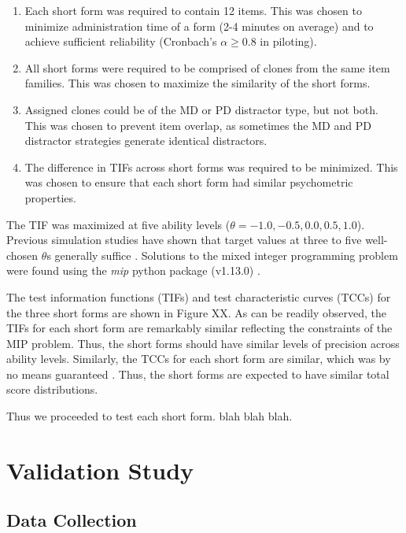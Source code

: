 \documentclass[a4paper,man,natbib]{apa6}
\begin{document}
\begin{enumerate}

    \item Each short form was required to contain 12 items. This was chosen to minimize administration time of a form (2-4 minutes on average) and to achieve sufficient  reliability (Cronbach's $\alpha \geq 0.8$ in piloting).
    
    \item All short forms were required to be comprised of clones from the same item families. This was chosen to maximize the similarity of the short forms.
    
    \item Assigned clones could be of the MD or PD distractor type, but not both. This was chosen to prevent item overlap, as sometimes the MD and PD distractor strategies generate identical distractors.
    
    \item The difference in TIFs across short forms was required to be minimized. This was chosen to ensure that each short form had similar psychometric properties. 
    
\end{enumerate}

\noindent The TIF was maximized at five ability levels ($\theta = -1.0, -0.5, 0.0, 0.5, 1.0$). Previous simulation studies have shown that target values at three to five well-chosen $\theta$s generally suffice \citep{der2005wj}. Solutions to the mixed integer programming problem were found using the \textit{mip} python package (v1.13.0) \citep{santos2020mixed}.

The test information functions (TIFs) and test characteristic curves (TCCs) for the three short forms are shown in Figure XX. As can be readily observed, the TIFs for each short form are remarkably similar reflecting the constraints of the MIP problem. Thus, the short forms should have similar levels of precision across ability levels. Similarly, the TCCs for each short form are similar, which was by no means guaranteed \citep{ali2016evaluation}. Thus, the short forms are expected to have similar total score distributions.

Thus we proceeded to test each short form. blah blah blah.

\section{Validation Study}

\subsection{Data Collection}
\end{document}
